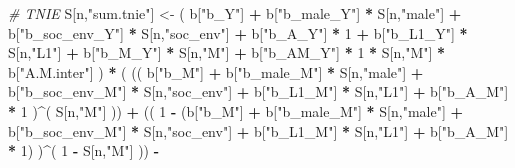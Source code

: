 \documentclass[
]{book}
\newenvironment{Shaded}{\begin{snugshade}}{\end{snugshade}}
\newcommand{\CommentTok}[1]{\textcolor[rgb]{0.56,0.35,0.01}{\textit{#1}}}
\newcommand{\DecValTok}[1]{\textcolor[rgb]{0.00,0.00,0.81}{#1}}
\newcommand{\NormalTok}[1]{#1}
\newcommand{\OtherTok}[1]{\textcolor[rgb]{0.56,0.35,0.01}{#1}}
\newcommand{\SpecialCharTok}[1]{\textcolor[rgb]{0.81,0.36,0.00}{\textbf{#1}}}
\newcommand{\StringTok}[1]{\textcolor[rgb]{0.31,0.60,0.02}{#1}}
\begin{document}
\begin{Shaded}
\begin{Highlighting}[]
    \CommentTok{\# TNIE }
\NormalTok{    S[n,}\StringTok{"sum.tnie"}\NormalTok{] }\OtherTok{\textless{}{-}}\NormalTok{ ( b[}\StringTok{"b\_Y"}\NormalTok{] }\SpecialCharTok{+} 
\NormalTok{                           b[}\StringTok{"b\_male\_Y"}\NormalTok{] }\SpecialCharTok{*}\NormalTok{ S[n,}\StringTok{"male"}\NormalTok{] }\SpecialCharTok{+} 
\NormalTok{                           b[}\StringTok{"b\_soc\_env\_Y"}\NormalTok{] }\SpecialCharTok{*}\NormalTok{ S[n,}\StringTok{"soc\_env"}\NormalTok{] }\SpecialCharTok{+} 
\NormalTok{                           b[}\StringTok{"b\_A\_Y"}\NormalTok{] }\SpecialCharTok{*} \DecValTok{1} \SpecialCharTok{+} 
\NormalTok{                           b[}\StringTok{"b\_L1\_Y"}\NormalTok{] }\SpecialCharTok{*}\NormalTok{ S[n,}\StringTok{"L1"}\NormalTok{] }\SpecialCharTok{+}
\NormalTok{                           b[}\StringTok{"b\_M\_Y"}\NormalTok{] }\SpecialCharTok{*}\NormalTok{ S[n,}\StringTok{"M"}\NormalTok{] }\SpecialCharTok{+}
\NormalTok{                           b[}\StringTok{"b\_AM\_Y"}\NormalTok{] }\SpecialCharTok{*} \DecValTok{1} \SpecialCharTok{*}\NormalTok{ S[n,}\StringTok{"M"}\NormalTok{] }\SpecialCharTok{*}\NormalTok{ b[}\StringTok{"A.M.inter"}\NormalTok{] ) }\SpecialCharTok{*}
\NormalTok{      ( (( b[}\StringTok{"b\_M"}\NormalTok{] }\SpecialCharTok{+} 
\NormalTok{             b[}\StringTok{"b\_male\_M"}\NormalTok{] }\SpecialCharTok{*}\NormalTok{ S[n,}\StringTok{"male"}\NormalTok{] }\SpecialCharTok{+} 
\NormalTok{             b[}\StringTok{"b\_soc\_env\_M"}\NormalTok{] }\SpecialCharTok{*}\NormalTok{ S[n,}\StringTok{"soc\_env"}\NormalTok{] }\SpecialCharTok{+} 
\NormalTok{             b[}\StringTok{"b\_L1\_M"}\NormalTok{] }\SpecialCharTok{*}\NormalTok{ S[n,}\StringTok{"L1"}\NormalTok{] }\SpecialCharTok{+}
\NormalTok{             b[}\StringTok{"b\_A\_M"}\NormalTok{] }\SpecialCharTok{*} \DecValTok{1}\NormalTok{ )}\SpecialCharTok{\^{}}\NormalTok{( S[n,}\StringTok{"M"}\NormalTok{] )) }\SpecialCharTok{+}
\NormalTok{          (( }\DecValTok{1} \SpecialCharTok{{-}}\NormalTok{ (b[}\StringTok{"b\_M"}\NormalTok{] }\SpecialCharTok{+} 
\NormalTok{                    b[}\StringTok{"b\_male\_M"}\NormalTok{] }\SpecialCharTok{*}\NormalTok{ S[n,}\StringTok{"male"}\NormalTok{] }\SpecialCharTok{+} 
\NormalTok{                    b[}\StringTok{"b\_soc\_env\_M"}\NormalTok{] }\SpecialCharTok{*}\NormalTok{ S[n,}\StringTok{"soc\_env"}\NormalTok{] }\SpecialCharTok{+} 
\NormalTok{                    b[}\StringTok{"b\_L1\_M"}\NormalTok{] }\SpecialCharTok{*}\NormalTok{ S[n,}\StringTok{"L1"}\NormalTok{] }\SpecialCharTok{+}
\NormalTok{                    b[}\StringTok{"b\_A\_M"}\NormalTok{] }\SpecialCharTok{*} \DecValTok{1}\NormalTok{) )}\SpecialCharTok{\^{}}\NormalTok{( }\DecValTok{1} \SpecialCharTok{{-}}\NormalTok{ S[n,}\StringTok{"M"}\NormalTok{] )) }\SpecialCharTok{{-}}

\end{Highlighting}
\end{Shaded}
\end{document}
